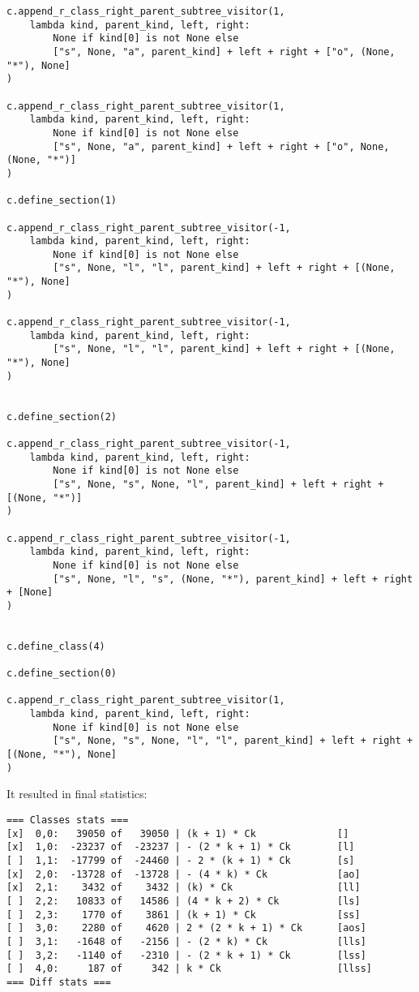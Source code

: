 \documentclass[final]{article}
\theoremstyle{definition}
\theoremstyle{definition}
\theoremstyle{remark}
\begin{document}
\begin{lstlisting}
c.append_r_class_right_parent_subtree_visitor(1,
    lambda kind, parent_kind, left, right:
        None if kind[0] is not None else
        ["s", None, "a", parent_kind] + left + right + ["o", (None, "*"), None]
)

c.append_r_class_right_parent_subtree_visitor(1,
    lambda kind, parent_kind, left, right:
        None if kind[0] is not None else
        ["s", None, "a", parent_kind] + left + right + ["o", None, (None, "*")]
)

c.define_section(1)

c.append_r_class_right_parent_subtree_visitor(-1,
    lambda kind, parent_kind, left, right:
        None if kind[0] is not None else
        ["s", None, "l", "l", parent_kind] + left + right + [(None, "*"), None]
)

c.append_r_class_right_parent_subtree_visitor(-1,
    lambda kind, parent_kind, left, right:
        ["s", None, "l", "l", parent_kind] + left + right + [(None, "*"), None]
)


c.define_section(2)

c.append_r_class_right_parent_subtree_visitor(-1,
    lambda kind, parent_kind, left, right:
        None if kind[0] is not None else
        ["s", None, "s", None, "l", parent_kind] + left + right + [(None, "*")]
)

c.append_r_class_right_parent_subtree_visitor(-1,
    lambda kind, parent_kind, left, right:
        None if kind[0] is not None else
        ["s", None, "l", "s", (None, "*"), parent_kind] + left + right + [None]
)


c.define_class(4)

c.define_section(0)

c.append_r_class_right_parent_subtree_visitor(1,
    lambda kind, parent_kind, left, right:
        None if kind[0] is not None else
        ["s", None, "s", None, "l", "l", parent_kind] + left + right + [(None, "*"), None]
)
\end{lstlisting}

It resulted in final statistics:

\begin{lstlisting}
=== Classes stats ===
[x]  0,0:   39050 of   39050 | (k + 1) * Ck              []
[x]  1,0:  -23237 of  -23237 | - (2 * k + 1) * Ck        [l]
[ ]  1,1:  -17799 of  -24460 | - 2 * (k + 1) * Ck        [s]
[x]  2,0:  -13728 of  -13728 | - (4 * k) * Ck            [ao]
[x]  2,1:    3432 of    3432 | (k) * Ck                  [ll]
[ ]  2,2:   10833 of   14586 | (4 * k + 2) * Ck          [ls]
[ ]  2,3:    1770 of    3861 | (k + 1) * Ck              [ss]
[ ]  3,0:    2280 of    4620 | 2 * (2 * k + 1) * Ck      [aos]
[ ]  3,1:   -1648 of   -2156 | - (2 * k) * Ck            [lls]
[ ]  3,2:   -1140 of   -2310 | - (2 * k + 1) * Ck        [lss]
[ ]  4,0:     187 of     342 | k * Ck                    [llss]
=== Diff stats ===
\end{lstlisting}
\end{document}
